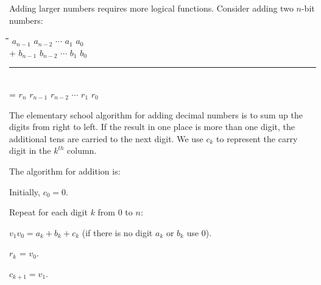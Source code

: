 \begin{schemeregion}
Adding larger numbers requires more logical functions.  Consider adding two $n$-bit numbers:
\begin{tabbing} 
\hspace*{2cm}  \= \qquad \= \qquad \= \quad\qquad\= \quad\qquad \= \quad\qquad\= \qquad\=  \kill
               \>       \>       \> $a_{n-1}$  \> $a_{n - 2}$ \> $\cdots$   \> $a_1$ \> $a_0$ \\
               \>  +    \>       \> $b_{n-1}$ \> $b_{n - 2}$ \> $\cdots$ \> $b_1$ \> $b_0$ \\[-0.5ex]
               \>    \> \rule{5.5cm}{0.2mm} \\[0ex]
               \>  =  \> $r_{n}$ \> $r_{n-1}$ \> $r_{n - 2}$ \> $\cdots$ \> $r_1$ \> $r_0$ \\
\end{tabbing}

The elementary school algorithm for adding decimal numbers is to sum up the digits from right to left.  If the result in one place is more than one digit, the additional tens are carried to the next digit.  We use $c_k$ to represent the carry digit in the $k^{th}$ column.


The algorithm for addition is:
\begin{itemtight}
\item Initially, $c_{0} = 0$.
\item Repeat for each digit $k$ from $0$ to $n$: 
\begin{enumtight}\vspace*{1.5ex}
\item $v_1v_0 = a_k + b_k + c_k$ (if there is no digit $a_k$ or $b_k$ use $0$).
\item $r_k$ = $v_0$.
\item $c_{k+1} = v_1$.
\end{enumtight}
\end{itemtight}


\end{schemeregion}
